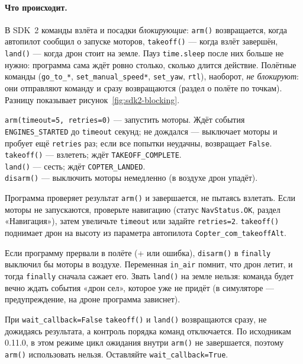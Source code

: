 \paragraph{Что происходит.} В SDK~2 команды взлёта и посадки \emph{блокирующие}: \verb|arm()| возвращается, когда автопилот сообщил о запуске моторов, \verb|takeoff()| --- когда взлёт завершён, \verb|land()| --- когда дрон стоит на земле. Пауз \verb|time.sleep| после них больше не нужно: программа сама ждёт ровно столько, сколько длится действие. Полётные команды (\verb|go_to_*|, \verb|set_manual_speed*|, \verb|set_yaw|, \verb|rtl|), наоборот, \emph{не блокируют}: они отправляют команду и сразу возвращаются (раздел о полёте по точкам). Разницу показывает рисунок~\ref{fig:sdk2-blocking}.



\begin{codebox}
\verb|arm(timeout=5, retries=0)| --- запустить моторы. Ждёт события \verb|ENGINES_STARTED| до \verb|timeout| секунд; не дождался --- выключает моторы и пробует ещё \verb|retries| раз; если все попытки неудачны, возвращает \verb|False|.\\
\verb|takeoff()| --- взлететь; ждёт \verb|TAKEOFF_COMPLETE|.\\
\verb|land()| --- сесть; ждёт \verb|COPTER_LANDED|.\\
\verb|disarm()| --- выключить моторы немедленно (в воздухе дрон упадёт).
\end{codebox}

Программа проверяет результат \verb|arm()| и завершается, не пытаясь взлетать. Если моторы не запускаются, проверьте навигацию (статус \verb|NavStatus.OK|, раздел «Навигация»), затем увеличьте \verb|timeout| или задайте \verb|retries=2|. \verb|takeoff()| поднимает дрон на высоту из параметра автопилота \texttt{Copter\_com\_takeoffAlt}.

\begin{warnbox}
Если программу прервали в полёте (+ или ошибка), \verb|disarm()| в \verb|finally| выключил бы моторы в воздухе. Переменная \verb|in_air| помнит, что дрон летит, и тогда \verb|finally| сначала сажает его. Звать \verb|land()| на земле нельзя: команда будет вечно ждать события «дрон сел», которое уже не придёт (в симуляторе --- предупреждение, на дроне программа зависнет).
\end{warnbox}

\begin{warnbox}
При \verb|wait_callback=False| \verb|takeoff()| и \verb|land()| возвращаются сразу, не дожидаясь результата, а контроль порядка команд отключается. По исходникам 0.11.0, в этом режиме цикл ожидания внутри \verb|arm()| не завершается, поэтому \verb|arm()| использовать нельзя. Оставляйте \verb|wait_callback=True|.
\end{warnbox}

